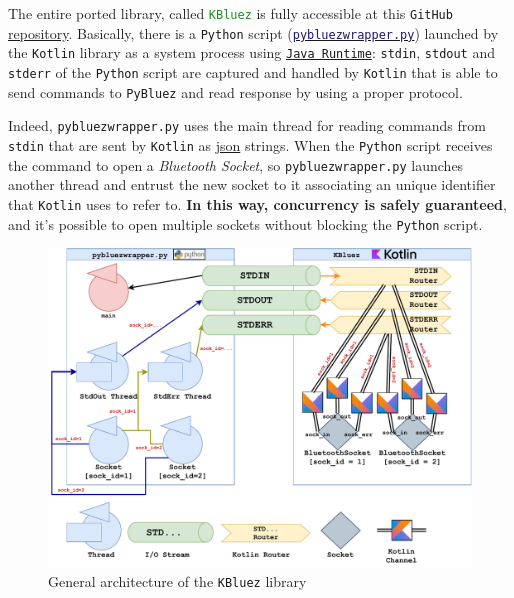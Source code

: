 The entire ported library, called \textcolor{ForestGreen}{\texttt{KBluez}} is fully accessible at this \texttt{GitHub} \href{https://github.com/LM-96/MobileSystemProject/tree/main/kBluez}{repository}.
Basically, there is a \texttt{Python} script (\href{https://github.com/LM-96/MobileSystemProject/blob/main/kBluez/lib/src/main/resources/python/pybluezwrapper.py}{\textcolor{MidnightBlue}{\texttt{pybluezwrapper.py}}}) launched by the \texttt{Kotlin} library as a system process using \href{https://docs.oracle.com/en/java/javase/18/docs/api/java.base/java/lang/Runtime.html}{\texttt{Java Runtime}}: \texttt{stdin}, \texttt{stdout} and \texttt{stderr} of the \texttt{Python} script are captured and handled by \texttt{Kotlin} that is able to send commands to \texttt{PyBluez} and read response by using a proper protocol.

Indeed, \texttt{pybluezwrapper.py} uses the main thread for reading commands from \texttt{stdin} that are sent by \texttt{Kotlin} as \href{https://en.wikipedia.org/wiki/JSON}{json} strings. When the \texttt{Python} script receives the command to open a \textit{Bluetooth Socket}, so \texttt{pybluezwrapper.py} launches another thread and entrust the new socket to it associating an unique identifier that \texttt{Kotlin} uses to refer to. \textbf{In this way, concurrency is safely guaranteed}, and it's possible to open multiple sockets without blocking the \texttt{Python} script.

\begin{figure}[h!]
	\centering
	\includegraphics[width=\textwidth]{img/kbluez_general_architecture.pdf}
	\caption{General architecture of the \texttt{KBluez} library}
	\label{fig:kbluez_general_architecture}
\end{figure}

